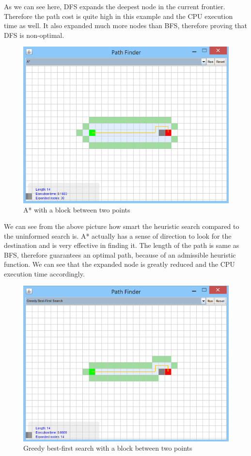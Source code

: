 \documentclass[a4paper]{article}
\begin{document}
\noindent As we can see here, DFS expands the deepest node in the current frontier. Therefore the path cost is quite high in this example and the CPU execution time as well. It also expanded much more nodes than BFS, therefore proving that DFS is non-optimal. \\

\begin{figure}[h!]
  \centering
    \includegraphics[scale=.9]{images/A1.png}
  \caption{A* with a block between two points}
\end{figure}

\noindent We can see from the above picture how smart the heuristic search compared to the uninformed search is. A* actually has a sense of direction to look for the destination and is very effective in finding it. The length of the path is same as BFS, therefore guarantees an optimal path, because of an admissible heuristic function. We can see that the expanded node is greatly reduced and the CPU execution time accordingly. \\

\begin{figure}[h!]
  \centering
    \includegraphics[scale=.9]{images/greedy1.png}
  \caption{Greedy best-first search with a block between two points}
\end{figure}
\end{document}
